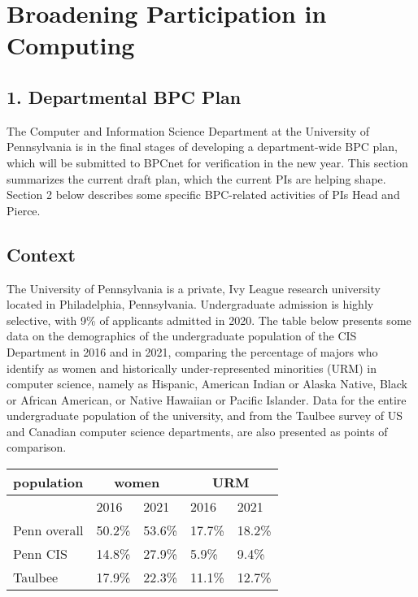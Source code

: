 
\section*{Broadening Participation in Computing}

\subsection*{1. Departmental BPC Plan}

The Computer and Information Science Department at the University of
Pennsylvania is in the final stages of developing a department-wide
BPC plan, which will be submitted to BPCnet for verification in the
new year.  This section summarizes the current draft plan, which the
current PIs are helping shape.  Section 2 below describes some
specific BPC-related activities of PIs Head and Pierce.

\subsection*{Context}

The University of Pennsylvania is a private, Ivy League research university located in Philadelphia, Pennsylvania. Undergraduate admission is highly selective, with 9\% of applicants admitted in 2020. The table below presents some data on the demographics of the undergraduate population of the CIS Department in 2016 and in 2021, comparing the percentage of majors who identify as women and historically under-represented minorities (URM) in computer science, namely as Hispanic, American Indian or Alaska Native, Black or African American, or Native Hawaiian or Pacific Islander. Data for the entire undergraduate population of the university, and from the Taulbee survey of US and Canadian computer science departments, are also presented as points of comparison.

\begin{center}
\begin{tabular}{|l|l|l|l|l|}
\hline
  population & \multicolumn{2}{|c|}{women} & \multicolumn{2}{|c|}{URM}
\\
\hline
  & 2016 & 2021 & 2016 & 2021
\\
\hline
Penn overall &
50.2\% &
53.6\% &
17.7\% &
18.2\%
\\
Penn CIS &
14.8\% &
27.9\% &
5.9\% &
9.4\%
\\
Taulbee &
17.9\% &
22.3\% &
11.1\% &
12.7\% \\
\hline
\end{tabular}
\end{center}

